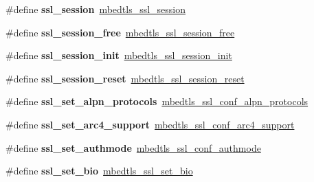 \begin{DoxyCompactItemize}
\item 
\mbox{\label{compat-1_83_8h_a6d06ee7156fdb322e0007cea5076ec29}} 
\#define {\bfseries ssl\+\_\+session}~\mbox{\hyperlink{structmbedtls__ssl__session}{mbedtls\+\_\+ssl\+\_\+session}}
\item 
\mbox{\label{compat-1_83_8h_a7959be46be934268d75ba43e3a078358}} 
\#define {\bfseries ssl\+\_\+session\+\_\+free}~\mbox{\hyperlink{ssl_8h_ac085defe1a02ab784a0a2fb201bcc741}{mbedtls\+\_\+ssl\+\_\+session\+\_\+free}}
\item 
\mbox{\label{compat-1_83_8h_afbb81ad5bff5dddd5b425ef1c413cffe}} 
\#define {\bfseries ssl\+\_\+session\+\_\+init}~\mbox{\hyperlink{ssl_8h_a7980469655c1cdb8fd7e966bffe1fd02}{mbedtls\+\_\+ssl\+\_\+session\+\_\+init}}
\item 
\mbox{\label{compat-1_83_8h_a0ab6e103f66e7a214ece0263946b2f78}} 
\#define {\bfseries ssl\+\_\+session\+\_\+reset}~\mbox{\hyperlink{ssl_8h_a21432367cbce428f10dcb62d9456fa7e}{mbedtls\+\_\+ssl\+\_\+session\+\_\+reset}}
\item 
\mbox{\label{compat-1_83_8h_a92c5635bcf1df30e26610a0796e11646}} 
\#define {\bfseries ssl\+\_\+set\+\_\+alpn\+\_\+protocols}~\mbox{\hyperlink{ssl_8h_ae21135dddd89b2ef273c13e140097f5a}{mbedtls\+\_\+ssl\+\_\+conf\+\_\+alpn\+\_\+protocols}}
\item 
\mbox{\label{compat-1_83_8h_a7c0880ea2f97099eddea410c1822788a}} 
\#define {\bfseries ssl\+\_\+set\+\_\+arc4\+\_\+support}~\mbox{\hyperlink{ssl_8h_a9e904913a122bd7cb13260217e4cc868}{mbedtls\+\_\+ssl\+\_\+conf\+\_\+arc4\+\_\+support}}
\item 
\mbox{\label{compat-1_83_8h_ac5d2dc0295ad7809399cf70d134a8f9c}} 
\#define {\bfseries ssl\+\_\+set\+\_\+authmode}~\mbox{\hyperlink{ssl_8h_a5695285c9dbfefec295012b566290f37}{mbedtls\+\_\+ssl\+\_\+conf\+\_\+authmode}}
\item 
\mbox{\label{compat-1_83_8h_aeb06712ab77e205d6f91f102aee0a73b}} 
\#define {\bfseries ssl\+\_\+set\+\_\+bio}~\mbox{\hyperlink{ssl_8h_a8b7442420aef7f1a76fa8c5336362f9e}{mbedtls\+\_\+ssl\+\_\+set\+\_\+bio}}
\item 

\end{DoxyCompactItemize}
